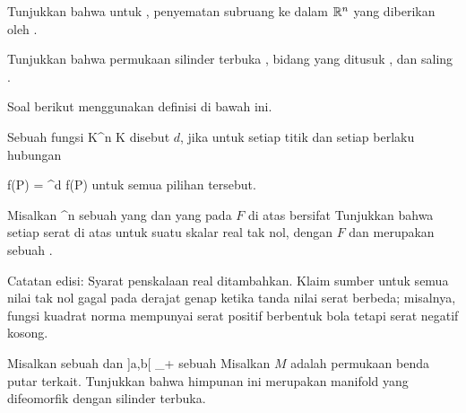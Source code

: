 {}
{

Tunjukkan bahwa untuk
, penyematan subruang
 ke dalam ${\mathbb R}^n$ yang diberikan oleh
.

}
{} {}

{}
{

Tunjukkan bahwa permukaan silinder terbuka
\mathl{S^1 \times {]0,1[}}{},
 bidang yang ditusuk
, dan
saling .

}
{} {}

Soal berikut menggunakan definisi di bawah ini.

Sebuah fungsi
 { {\mathbb K}^n } { {\mathbb K}
} {}
disebut
$d$, jika untuk setiap titik
 dan setiap
 berlaku hubungan

\mavergleichskettedisp
{\vergleichskette
{f(\lambda P)
}
{ =} { \lambda^d f(P)
}
{ } {
}
{ } {
}
{ } {
}
}
{}{}{}
untuk semua pilihan tersebut.

{}
{

Misalkan
 {\R^n } {\R
} {}
sebuah
 yang
dan yang pada
$F$ di atas
bersifat 
Tunjukkan bahwa setiap serat di atas
untuk suatu skalar real tak nol,
 dengan $F$ dan merupakan sebuah
.

Catatan edisi: Syarat penskalaan real ditambahkan. Klaim sumber untuk semua nilai tak nol gagal pada derajat genap ketika tanda nilai serat berbeda; misalnya, fungsi kuadrat norma mempunyai serat positif berbentuk bola tetapi serat negatif kosong.

}
{} {}

{}
{

Misalkan
\mathl{]a,b[}{} sebuah
dan
 {]a,b[} {\R_{+}
} {}
sebuah
Misalkan $M$ adalah permukaan benda putar terkait. Tunjukkan bahwa himpunan ini merupakan manifold yang difeomorfik dengan silinder terbuka.

}
{} {}

